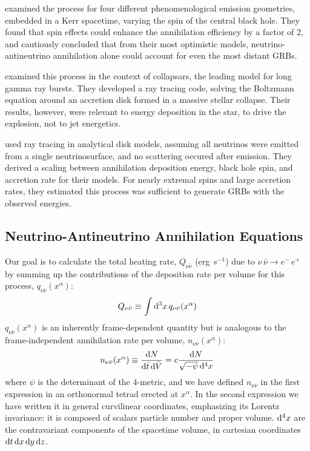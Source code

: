 \cite{birk2007-nunubar} examined the process for four different phenomenological
emission geometries, embedded in a Kerr spacetime, varying the spin of the
central black hole. They found that spin effects could enhance the annihilation
efficiency by a factor of 2, and cautiously concluded that from their most
optimistic models, neutrino-antineutrino annihilation alone could account for
even the most distant GRBs.

\cite{hari2010-nunubar} examined this process in the context of collapsars,
the leading model for long gamma ray bursts. They developed a ray tracing code,
solving the Boltzmann equation around an accretion disk formed in a massive
stellar collapse. Their results, however, were relevant to energy deposition
in the star, to drive the explosion, not to jet energetics.

\cite{zala2011-nunubar} used ray tracing in analytical disk models, assuming
all neutrinos were emitted from a single neutrinosurface, and no scattering
occured after emission. They derived a scaling between annihilation deposition
energy, black hole spin, and accretion rate for their models. For nearly
extremal spins and large accretion rates, they estimated this process was
sufficient to generate GRBs with the observed energies.

\subsection{Neutrino-Antineutrino Annihilation Equations}
\label{ssec:nunubar_integral}
Our goal is to calculate the total heating rate, $Q_{\nu \bar{\nu}}$ (erg~s$^{-1}$)
due to $\nu\,\bar{\nu} \rightarrow e^{-}\,e^{+}$ by summing up the contributions
of the deposition rate per volume for this process,
$q_{\nu \bar{\nu}}(x^\alpha)$:
\begin{equation}
  \label{eqn:Q_vol}
  Q_{\nu \bar{\nu}} \equiv \int \mathrm{d}^3 x\,q_{\nu \bar{\nu}}(x^\alpha)
\end{equation}
$q_{\nu \bar{\nu}}(x^\alpha)$ is an inherently frame-dependent quantity but is
analogous to the frame-independent annihilation rate per volume,
$n_{\nu \bar{\nu}}(x^\alpha)$:
\begin{equation}
  n_{\nu \bar{\nu}}(x^\alpha) \equiv
  \frac{\mathrm{d} N}{\mathrm{d} \bar{t} \, \mathrm{d} \bar{V}} =
  c \frac{\mathrm{d} N}{\sqrt{-\psi}\,\mathrm{d}^4 x}
\end{equation}
where $\psi$ is the determinant of the 4-metric, and we have defined
$n_{\nu \bar{\nu}}$ in the first expression in an orthonormal tetrad erected at
$x^\alpha$. In the second expression we have written it in general curvilinear
coordinates, emphasizing its Lorentz invariance: it is composed of scalars
particle number and proper volume. $\mathrm{d}^4 x$ are the contravariant components
of the spacetime volume, in cartesian coordinates
$\mathrm{d} t \, \mathrm{d} x \, \mathrm{d} y \, \mathrm{d} z$.


